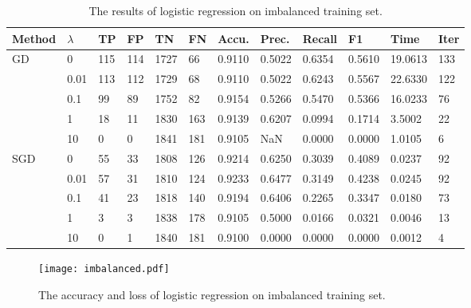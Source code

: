 \begin{table}[H]
    \centering
    \caption{The results of logistic regression on imbalanced training set.}
    \label{tab:lr-1}
    \begin{tabular}{llllllllllll}
        \toprule
        Method               & $\lambda$ & TP  & FP  & TN   & FN  & Accu.  & Prec.  & Recall & F1     & Time    & Iter \\
        \midrule
        \multirow{5}{*}{GD}  & 0         & 115 & 114 & 1727 & 66  & 0.9110 & 0.5022 & 0.6354 & 0.5610 & 19.0613 & 133  \\
                             & 0.01      & 113 & 112 & 1729 & 68  & 0.9110 & 0.5022 & 0.6243 & 0.5567 & 22.6330 & 122  \\
                             & 0.1       & 99  & 89  & 1752 & 82  & 0.9154 & 0.5266 & 0.5470 & 0.5366 & 16.0233 & 76   \\
                             & 1         & 18  & 11  & 1830 & 163 & 0.9139 & 0.6207 & 0.0994 & 0.1714 & 3.5002  & 22   \\
                             & 10        & 0   & 0   & 1841 & 181 & 0.9105 & NaN    & 0.0000 & 0.0000 & 1.0105  & 6    \\
        \midrule
        \multirow{5}{*}{SGD} & 0         & 55  & 33  & 1808 & 126 & 0.9214 & 0.6250 & 0.3039 & 0.4089 & 0.0237  & 92   \\
                             & 0.01      & 57  & 31  & 1810 & 124 & 0.9233 & 0.6477 & 0.3149 & 0.4238 & 0.0245  & 92   \\
                             & 0.1       & 41  & 23  & 1818 & 140 & 0.9194 & 0.6406 & 0.2265 & 0.3347 & 0.0180  & 73   \\
                             & 1         & 3   & 3   & 1838 & 178 & 0.9105 & 0.5000 & 0.0166 & 0.0321 & 0.0046  & 13   \\
                             & 10        & 0   & 1   & 1840 & 181 & 0.9100 & 0.0000 & 0.0000 & 0.0000 & 0.0012  & 4    \\
        \bottomrule
    \end{tabular}
\end{table}
\begin{figure}[H]
    \centering
    \texttt{[image: imbalanced.pdf]}
    \caption{The accuracy and loss of logistic regression on imbalanced training set.}
    \label{fig:lr-1}
\end{figure}
